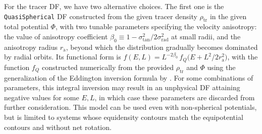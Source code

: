 \documentclass[usenatbib,fleqn]{mnras}
\begin{document}
For the tracer DF, we have two alternative choices. The first one is the \texttt{QuasiSpherical} DF constructed from the given tracer density $\rho_\text{tr}$ in the given total potential $\Phi$, with two tunable parameters specifying the velocity anisotropy: the value of anisotropy coefficient $\beta_0 \equiv 1 - \sigma_\text{tan}^2 / 2\sigma_\text{rad}^2$ at small radii, and the anisotropy radius $r_\text{a}$, beyond which the distribution gradually becomes dominated by radial orbits. Its functional form is $f(E,L) = L^{-2\beta_0}\,f_Q\big(E + L^2/2r_\text{a}^2\big)$, with the function $f_Q$ constructed numerically from the provided $\rho_\text{tr}$ and $\Phi$ using the generalization of the Eddington inversion formula by \citet{Cuddeford1991}. For some combinations of parameters, this integral inversion may result in an unphysical DF attaining negative values for some $E,L$, in which case these parameters are discarded from further consideration. 
This model can be used even with non-spherical potentials, but is limited to systems whose equidensity contours match the equipotential contours and without net rotation. 
\end{document}
